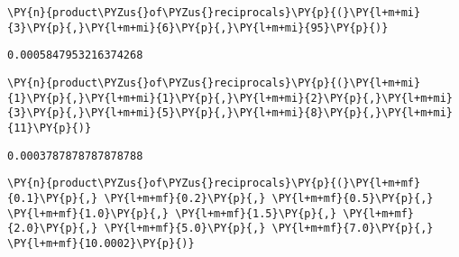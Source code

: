     \begin{tcolorbox}[breakable, size=fbox, boxrule=1pt, pad at break*=1mm,colback=cellbackground, colframe=cellborder]
\begin{Verbatim}[commandchars=\\\{\}]
\PY{n}{product\PYZus{}of\PYZus{}reciprocals}\PY{p}{(}\PY{l+m+mi}{3}\PY{p}{,}\PY{l+m+mi}{6}\PY{p}{,}\PY{l+m+mi}{95}\PY{p}{)}
\end{Verbatim}
\end{tcolorbox}

            \begin{tcolorbox}[breakable, size=fbox, boxrule=.5pt, pad at break*=1mm, opacityfill=0]
\begin{Verbatim}[commandchars=\\\{\}]
0.0005847953216374268
\end{Verbatim}
\end{tcolorbox}
        
    \begin{tcolorbox}[breakable, size=fbox, boxrule=1pt, pad at break*=1mm,colback=cellbackground, colframe=cellborder]
\begin{Verbatim}[commandchars=\\\{\}]
\PY{n}{product\PYZus{}of\PYZus{}reciprocals}\PY{p}{(}\PY{l+m+mi}{1}\PY{p}{,}\PY{l+m+mi}{1}\PY{p}{,}\PY{l+m+mi}{2}\PY{p}{,}\PY{l+m+mi}{3}\PY{p}{,}\PY{l+m+mi}{5}\PY{p}{,}\PY{l+m+mi}{8}\PY{p}{,}\PY{l+m+mi}{11}\PY{p}{)}
\end{Verbatim}
\end{tcolorbox}

            \begin{tcolorbox}[breakable, size=fbox, boxrule=.5pt, pad at break*=1mm, opacityfill=0]
\begin{Verbatim}[commandchars=\\\{\}]
0.0003787878787878788
\end{Verbatim}
\end{tcolorbox}
        
    \begin{tcolorbox}[breakable, size=fbox, boxrule=1pt, pad at break*=1mm,colback=cellbackground, colframe=cellborder]
\begin{Verbatim}[commandchars=\\\{\}]
\PY{n}{product\PYZus{}of\PYZus{}reciprocals}\PY{p}{(}\PY{l+m+mf}{0.1}\PY{p}{,} \PY{l+m+mf}{0.2}\PY{p}{,} \PY{l+m+mf}{0.5}\PY{p}{,} \PY{l+m+mf}{1.0}\PY{p}{,} \PY{l+m+mf}{1.5}\PY{p}{,} \PY{l+m+mf}{2.0}\PY{p}{,} \PY{l+m+mf}{5.0}\PY{p}{,} \PY{l+m+mf}{7.0}\PY{p}{,} \PY{l+m+mf}{10.0002}\PY{p}{)}
\end{Verbatim}
\end{tcolorbox}

